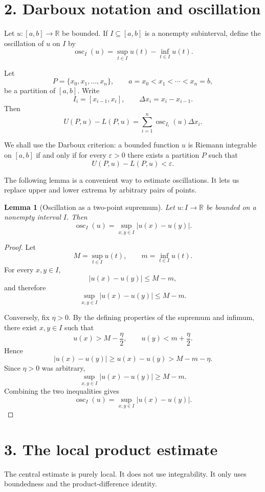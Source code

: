 \documentclass[11pt]{article}
\newcommand{\R}{\mathbb{R}}
\newcommand{\dxi}{\Delta x_i}
\DeclareMathOperator{\osc}{osc}
\theoremstyle{plain}
\newtheorem{lemma}{Lemma}
\theoremstyle{remark}
\begin{document}
\section*{2. Darboux notation and oscillation}

Let $u:[a,b]\to\R$ be bounded. If $I\subseteq [a,b]$ is a nonempty subinterval, define the oscillation of $u$ on $I$ by
\[
    \osc_I(u)=\sup_{t\in I}u(t)-\inf_{t\in I}u(t).
\]

Let
\[
    P=\{x_0,x_1,\dots,x_n\},
    \qquad
    a=x_0<x_1<\cdots <x_n=b,
\]
be a partition of $[a,b]$. Write
\[
    I_i=[x_{i-1},x_i],
    \qquad
    \dxi=x_i-x_{i-1}.
\]
Then
\[
    U(P,u)-L(P,u)
    =\sum_{i=1}^n \osc_{I_i}(u)\dxi.
\]

We shall use the Darboux criterion: a bounded function $u$ is Riemann integrable on $[a,b]$ if and only if for every $\varepsilon>0$ there exists a partition $P$ such that
\[
    U(P,u)-L(P,u)<\varepsilon.
\]

The following lemma is a convenient way to estimate oscillations. It lets us replace upper and lower extrema by arbitrary pairs of points.

\begin{lemma}[Oscillation as a two-point supremum]
Let $u:I\to\R$ be bounded on a nonempty interval $I$. Then
\[
    \osc_I(u)=\sup_{x,y\in I}|u(x)-u(y)|.
\]
\end{lemma}

\begin{proof}
Let
\[
    M=\sup_{t\in I}u(t),
    \qquad
    m=\inf_{t\in I}u(t).
\]
For every $x,y\in I$,
\[
    |u(x)-u(y)|\leq M-m,
\]
and therefore
\[
    \sup_{x,y\in I}|u(x)-u(y)|\leq M-m.
\]

Conversely, fix $\eta>0$. By the defining properties of the supremum and infimum, there exist $x,y\in I$ such that
\[
    u(x)>M-\frac{\eta}{2},
    \qquad
    u(y)<m+\frac{\eta}{2}.
\]
Hence
\[
    |u(x)-u(y)|\geq u(x)-u(y)>M-m-\eta.
\]
Since $\eta>0$ was arbitrary,
\[
    \sup_{x,y\in I}|u(x)-u(y)|\geq M-m.
\]
Combining the two inequalities gives
\[
    \osc_I(u)=\sup_{x,y\in I}|u(x)-u(y)|.
\]
\end{proof}

\section*{3. The local product estimate}

The central estimate is purely local. It does not use integrability. It only uses boundedness and the product-difference identity.
\end{document}
